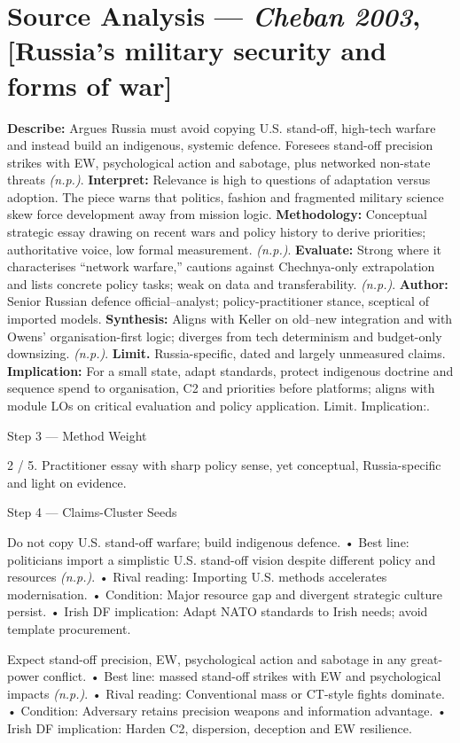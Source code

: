 \section*{Source Analysis — \textit{Cheban 2003}, [Russia’s military security and forms of war]}
\textbf{Describe:} Argues Russia must avoid copying U.S. stand-off, high-tech warfare and instead build an indigenous, systemic defence. Foresees stand-off precision strikes with EW, psychological action and sabotage, plus networked non-state threats \emph{(n.p.)}.
\textbf{Interpret:} Relevance is high to questions of adaptation versus adoption. The piece warns that politics, fashion and fragmented military science skew force development away from mission logic.
\textbf{Methodology:} Conceptual strategic essay drawing on recent wars and policy history to derive priorities; authoritative voice, low formal measurement. \emph{(n.p.)}.
\textbf{Evaluate:} Strong where it characterises “network warfare,” cautions against Chechnya-only extrapolation and lists concrete policy tasks; weak on data and transferability. \emph{(n.p.)}.
\textbf{Author:} Senior Russian defence official–analyst; policy-practitioner stance, sceptical of imported models.
\textbf{Synthesis:} Aligns with Keller on old–new integration and with Owens’ organisation-first logic; diverges from tech determinism and budget-only downsizing. \emph{(n.p.)}.
\textbf{Limit.} Russia-specific, dated and largely unmeasured claims. \textbf{Implication:} For a small state, adapt standards, protect indigenous doctrine and sequence spend to organisation, C2 and priorities before platforms; aligns with module LOs on critical evaluation and policy application. Limit. Implication:.

Step 3 — Method Weight

2 / 5. Practitioner essay with sharp policy sense, yet conceptual, Russia-specific and light on evidence.

Step 4 — Claims-Cluster Seeds

Do not copy U.S. stand-off warfare; build indigenous defence.
• Best line: politicians import a simplistic U.S. stand-off vision despite different policy and resources \emph{(n.p.)}.
• Rival reading: Importing U.S. methods accelerates modernisation.
• Condition: Major resource gap and divergent strategic culture persist.
• Irish DF implication: Adapt NATO standards to Irish needs; avoid template procurement.

Expect stand-off precision, EW, psychological action and sabotage in any great-power conflict.
• Best line: massed stand-off strikes with EW and psychological impacts \emph{(n.p.)}.
• Rival reading: Conventional mass or CT-style fights dominate.
• Condition: Adversary retains precision weapons and information advantage.
• Irish DF implication: Harden C2, dispersion, deception and EW resilience.


